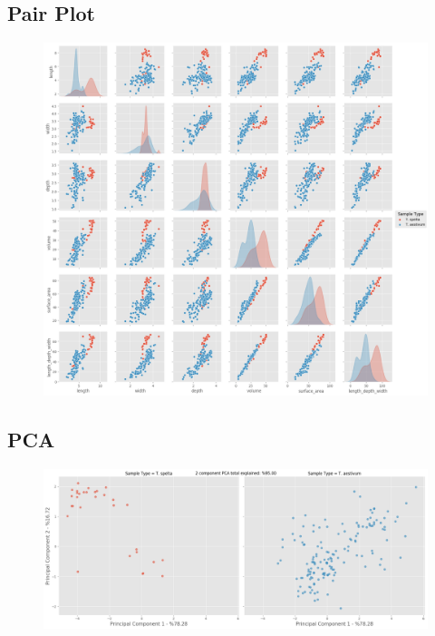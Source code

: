 \documentclass[11pt]{report}
\begin{document}
\subsection{Pair Plot}
\label{sec:org06eca81}

\begin{figure}[htbp]
\centering
\includegraphics[width=18cm]{./images/results/group3/pairplot.png}
\label{fig:org8126b40}
\end{figure}

\clearpage
\subsection{PCA}
\label{sec:org984528e}
\begin{figure}[htbp]
\centering
\includegraphics[width=18cm]{./images/results/group3/pca.png}
\label{fig:org2e217bb}
\end{figure}
\end{document}
